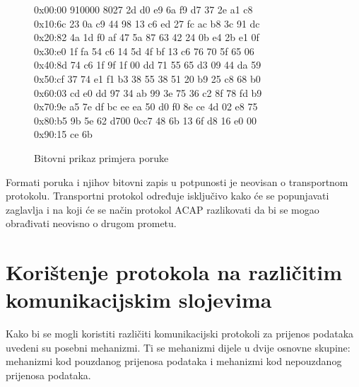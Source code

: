 \begin{figure}[htb]
\begin{center}
\begin{minipage}{0.6\linewidth}
\begin{footnotesize}
\begin{monoblock}
\noindent 0x00:\colorbox{blue!30}{00 91}\colorbox{red!30}{00}\colorbox{yellow!30}{00 80}\colorbox{orange!30}{27 2d d0 e9 6a f9 d7 37 2e a1 c8} \\
0x10:\colorbox{orange!30}{6c 23 0a c9 44 98 13 c6 ed 27 fc ac b8 3c 91 dc} \\
0x20:\colorbox{orange!30}{82 4a 1d f0 af 47 5a 87 63 42 24 0b e4 2b e1 0f} \\
0x30:\colorbox{orange!30}{e0 1f fa 54 c6 14 5d 4f bf 13 c6 76 70 5f 65 06} \\
0x40:\colorbox{orange!30}{8d 74 c6 1f 9f 1f 00 dd 71 55 65 d3 09 44 da 59} \\
0x50:\colorbox{orange!30}{cf 37 74 e1 f1 b3 38 55 38 51 20 b9 25 c8 68 b0} \\
0x60:\colorbox{orange!30}{03 cd e0 dd 97 34 ab 99 3e 75 36 c2 8f 78 fd b9} \\
0x70:\colorbox{orange!30}{9e a5 7e df bc ee ea 50 d0 f0 8e ce 4d 02 e8 75} \\
0x80:\colorbox{orange!30}{b5 9b 5e 62 d7}\colorbox{green!30}{00 0c}\colorbox{purple!30}{c7 48 6b 13 6f d8 16 e0 00} \\
0x90:\colorbox{purple!30}{15 ce 6b}
\end{monoblock}
\end{footnotesize}
\end{minipage}
\vspace{-20pt}
\end{center}
\caption{Bitovni prikaz primjera poruke \initi{}}
\label{fig:initi_bits}
\end{figure}

Formati poruka i njihov bitovni zapis u potpunosti je neovisan o transportnom
protokolu. Transportni protokol određuje isključivo kako će se popunjavati
zaglavlja i na koji će se način protokol ACAP razlikovati da bi se mogao
obrađivati neovisno o drugom prometu.

\section{Korištenje protokola na različitim komunikacijskim slojevima}

Kako bi se mogli koristiti različiti komunikacijski protokoli za prijenos
podataka uvedeni su posebni mehanizmi. Ti se mehanizmi dijele u dvije osnovne
skupine: mehanizmi kod pouzdanog prijenosa podataka i mehanizmi kod nepouzdanog
prijenosa podataka.

